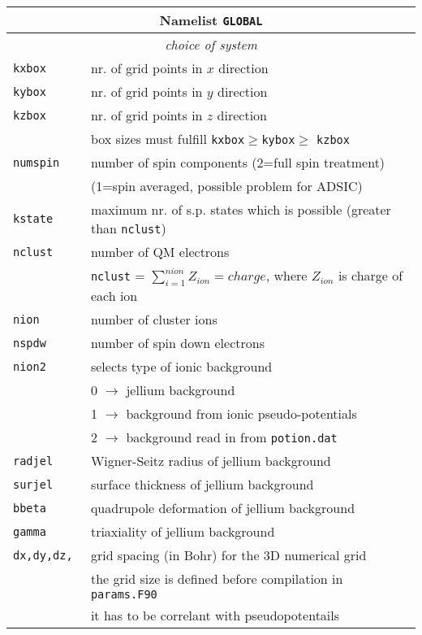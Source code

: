 \documentclass[12pt]{article}
\begin{document}
\begin{enumerate}
\begin{tabular}{ll}
\hline
\multicolumn{2}{c}{Namelist {\tt GLOBAL}} in {\tt for005.<name>} \\
\hline
\multicolumn{2}{c}{\it choice of system} \\
\hline
{\tt kxbox            }& nr. of grid points in $x$ direction\\
{\tt kybox            }& nr. of grid points in $y$ direction\\
{\tt kzbox            }& nr. of grid points in $z$ direction\\
& box sizes must fulfill {\tt kxbox}$\geq${\tt kybox}$\geq$ {\tt kzbox}\\
{\tt numspin}          & number of spin components (2=full spin treatment)\\
                       & (1=spin averaged, possible problem for ADSIC)\\
{\tt kstate           }& maximum nr. of s.p. states which is possible (greater than {\tt nclust})\\
{\tt nclust           }& number of QM electrons\\
& {\tt nclust} = $\sum_{i=1}^{nion} Z_{ion} = charge$, where $Z_{ion}$ is charge of each ion\\
{\tt nion             }& number of cluster ions\\
{\tt nspdw            }& number of spin down electrons \\
{\tt nion2            }& selects type of ionic background \\
                       &  0 $\rightarrow$ jellium background \\
                       &  1 $\rightarrow$ background from ionic pseudo-potentials\\
                       &  2 $\rightarrow$ background read in from {\tt potion.dat}\\
{\tt radjel           }& Wigner-Seitz radius of jellium background\\
{\tt surjel         }& surface thickness of jellium background\\
{\tt bbeta         }& quadrupole deformation of jellium background\\
{\tt gamma         }& triaxiality of jellium background\\
{\tt dx,dy,dz,        }& grid spacing (in  Bohr) for the 3D numerical grid\\
&the grid size is defined before compilation in {\tt params.F90}\\
&it has to be correlant with pseudopotentails\\

\end{tabular}
\end{enumerate}
\end{document}
